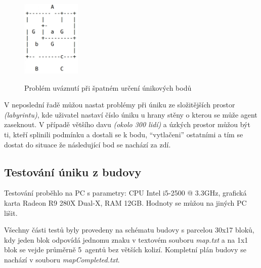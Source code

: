 \documentclass[czech,public,dept460,male,cpdeclaration]{diploma}
\begin{document}
\begin{figure}[H]\centering\includegraphics[width=0.25\textwidth]{Figures/buildingEscapeProblem2.jpg}\label{fig:buildingEscapeProblem1}
	\caption{Problém uváznutí při špatném určení únikových bodů}
	\label{fig:buildingEscapeProblem1}
\end{figure}

V neposlední řadě můžou nastat problémy při úniku ze složitějších prostor \textit{(labyrintu)}, kde uživatel nastaví číslo úniku u hrany stěny o kterou se může agent zaseknout. V případě většího davu \textit{(okolo 300 lidí)} a úzkých prostor můžou být ti, kteří splinili podmínku a dostali se k bodu, ``vytlačeni'' ostatními a tím se dostat do situace že následující bod se nachází za zdí. 
\subsection{Testování úniku z budovy}\label{sec:testovani-uniku-z-budovy}

Testování proběhlo na PC s parametry: CPU Intel i5-2500 @ 3.3GHz, grafická karta Radeon R9 280X Dual-X, RAM 12GB. Hodnoty se můžou na jiných PC lišit.



Všechny části testů byly provedeny na schématu budovy s parcelou 30x17 bloků, kdy jeden blok odpovídá jednomu znaku v textovém souboru \textit{map.txt} a na 1x1 blok se vejde průměrně 5~agentů bez větších kolizí. Kompletní plán budovy se nachází v souboru \textit{mapCompleted.txt}.
\end{document}
